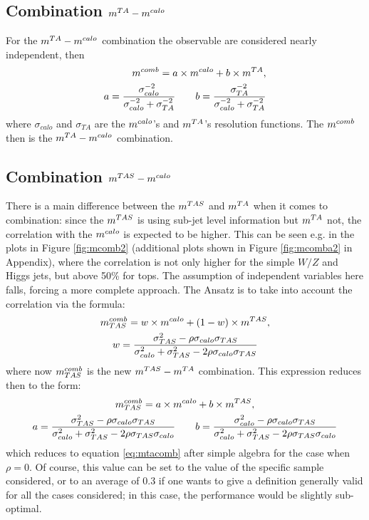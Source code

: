 \subsection{Combination $m^{TA}-m^{calo}$ }

For the $m^{TA}-m^{calo}$ combination the observable are considered nearly independent, then
\begin{equation}\begin{split}
 m^{comb}= a\times m^{calo} + b \times m^{TA},\\
 a=\frac{\sigma_{calo}^{-2}}{\sigma_{calo}^{-2}+\sigma_{TA}^{-2}} \qquad b=\frac{\sigma_{TA}^{-2}}{\sigma_{calo}^{-2}+\sigma_{TA}^{-2}}
\end{split}
\label{eq:mtacomb}
\end{equation}
where $\sigma_{calo}$ and $\sigma_{TA}$ are the $m^{calo}$'s and $m^{TA}$'s resolution functions. The $m^{comb}$ then is the $m^{TA}-m^{calo}$ combination.

\subsection{Combination $m^{TAS}-m^{calo}$ }

There is a main difference between the $m^{TAS}$ and $m^{TA}$ when it comes to combination: since the $m^{TAS}$ is using sub-jet level information but $m^{TA}$ not, the correlation with the $m^{calo}$ is expected to be higher.
This can be seen e.g. in the plots in Figure \ref{fig:mcomb2} (additional plots shown in Figure \ref{fig:mcomba2} in Appendix), where the correlation is not only higher for the simple $W/Z$ and Higgs jets, but above 50\% for tops. The assumption of independent variables here falls, forcing a more complete approach. The Ansatz is to take into account the correlation via the formula:
\begin{equation}
\begin{gathered}
m^{comb}_{TAS}= w\times m^{calo} + (1-w)\times m^{TAS},\\
w=\frac{\sigma_{TAS}^2-\rho\sigma_{calo}\sigma_{TAS}}{\sigma_{calo}^2+\sigma_{TAS}^2-2\rho\sigma_{calo}\sigma_{TAS}}
\end{gathered}
\label{eq:mtascomb}
\end{equation}
% 
where now $m^{comb}_{TAS}$ is the new $m^{TAS}-m^{TA}$ combination. This expression reduces then to the form:
\begin{equation}
\begin{gathered}
m^{comb}_{TAS}= a\times m^{calo} + b\times m^{TAS},\\
a=\frac{\sigma_{TAS}^2-\rho\sigma_{calo}\sigma_{TAS}}{\sigma_{calo}^2+\sigma_{TAS}^2-2\rho\sigma_{TAS}\sigma_{calo}}\qquad b=\frac{\sigma_{calo}^2-\rho\sigma_{calo}\sigma_{TAS}}{\sigma_{calo}^2+\sigma_{TAS}^2-2\rho\sigma_{TAS}\sigma_{calo}}
\end{gathered}
\end{equation}
which reduces to equation \eqref{eq:mtacomb} after simple algebra for the case when $\rho=0$. Of course, this value can be set to the value of the specific sample considered, or to an average of 0.3 if one wants to give a definition generally valid for all the cases considered; in this case, the performance would be slightly sub-optimal.

